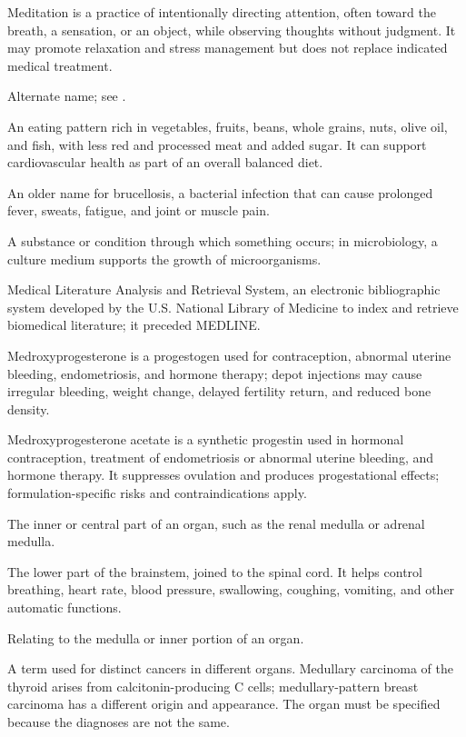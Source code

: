  Meditation is a practice of intentionally directing attention, often toward the breath, a sensation, or an object, while observing thoughts without judgment. It may promote relaxation and stress management but does not replace indicated medical treatment.

 Alternate name; see .

 An eating pattern rich in vegetables, fruits, beans, whole grains, nuts, olive oil, and fish, with less red and processed meat and added sugar. It can support cardiovascular health as part of an overall balanced diet.

 An older name for brucellosis, a bacterial infection that can cause prolonged fever, sweats, fatigue, and joint or muscle pain.

 A substance or condition through which something occurs; in microbiology, a culture medium supports the growth of microorganisms.

 Medical Literature Analysis and Retrieval System, an electronic bibliographic system developed by the U.S. National Library of Medicine to index and retrieve biomedical literature; it preceded MEDLINE.

 Medroxyprogesterone is a progestogen used for contraception, abnormal uterine bleeding, endometriosis, and hormone therapy; depot injections may cause irregular bleeding, weight change, delayed fertility return, and reduced bone density.

 Medroxyprogesterone acetate is a synthetic progestin used in hormonal contraception, treatment of endometriosis or abnormal uterine bleeding, and hormone therapy. It suppresses ovulation and produces progestational effects; formulation-specific risks and contraindications apply.

 The inner or central part of an organ, such as the renal medulla or adrenal medulla.

 The lower part of the brainstem, joined to the spinal cord. It helps control breathing, heart rate, blood pressure, swallowing, coughing, vomiting, and other automatic functions.

 Relating to the medulla or inner portion of an organ.

 A term used for distinct cancers in different organs. Medullary carcinoma of the thyroid arises from calcitonin-producing C cells; medullary-pattern breast carcinoma has a different origin and appearance. The organ must be specified because the diagnoses are not the same.

